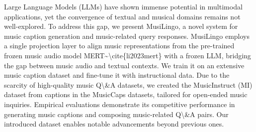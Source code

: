 Large Language Models (LLMs) have shown immense potential in multimodal applications, yet the convergence of textual and musical domains remains not well-explored. To address this gap, we present MusiLingo, a novel system for music caption generation and music-related query responses. MusiLingo employs a single projection layer to align music representations from the pre-trained frozen music audio model MERT\textasciitilde{}\textbackslash{}cite\{li2023mert\} with a frozen LLM, bridging the gap between music audio and textual contexts. We train it on an extensive music caption dataset and fine-tune it with instructional data. Due to the scarcity of high-quality music Q\textbackslash{}\&A datasets, we created the MusicInstruct (MI) dataset from captions in the MusicCaps datasets, tailored for open-ended music inquiries. Empirical evaluations demonstrate its competitive performance in generating music captions and composing music-related Q\textbackslash{}\&A pairs. Our introduced dataset enables notable advancements beyond previous ones.